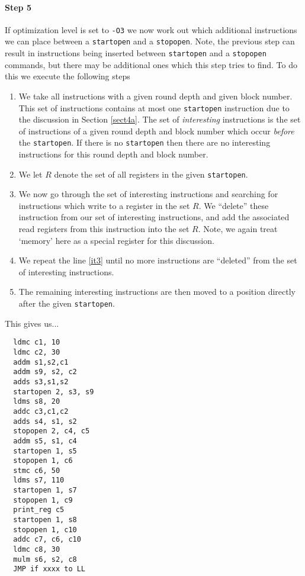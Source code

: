 \paragraph{Step 5}
If optimization level is set to \verb+-O3+ we now work out which 
additional instructions we can place between
a \verb+startopen+ and a \verb+stopopen+.
Note, the previous step can result in instructions being
inserted between \verb+startopen+ and a \verb+stopopen+
commands, but there may be additional ones which this
step tries to find.
To do this we execute the following steps
\begin{enumerate}
\item We take all instructions with a given round depth and given
block number. This set of instructions contains at most one
\verb+startopen+ instruction due to the discussion in Section \ref{sect4a}.
The set of {\em interesting} instructions is the set of instructions
of a given round depth and block number which occur {\em before}
the \verb+startopen+. If there is no \verb+startopen+ then there
are no interesting instructions for this round depth and block number.
\item We let $R$ denote the set of all registers in the given
\verb+startopen+.
\item \label{it3} We now go through the set of interesting instructions
and searching for instructions which write to a register
in the set $R$. We ``delete'' these instruction from our set of
interesting instructions, and add the associated read registers from this
instruction into the set $R$.
Note, we again treat `memory' here as a special register for this discussion.
\item We repeat the line \ref{it3} until no more instructions
are ``deleted'' from the set of interesting instructions.
\item The remaining interesting instructions are then moved to
a position directly after the given \verb+startopen+.
\end{enumerate}
This gives us...
\begin{verbatim}
  ldmc c1, 10
  ldmc c2, 30
  addm s1,s2,c1
  addm s9, s2, c2
  adds s3,s1,s2
  startopen 2, s3, s9
  ldms s8, 20
  addc c3,c1,c2
  adds s4, s1, s2
  stopopen 2, c4, c5
  addm s5, s1, c4
  startopen 1, s5
  stopopen 1, c6
  stmc c6, 50
  ldms s7, 110
  startopen 1, s7
  stopopen 1, c9
  print_reg c5
  startopen 1, s8
  stopopen 1, c10
  addc c7, c6, c10
  ldmc c8, 30
  mulm s6, s2, c8
  JMP if xxxx to LL
\end{verbatim}

